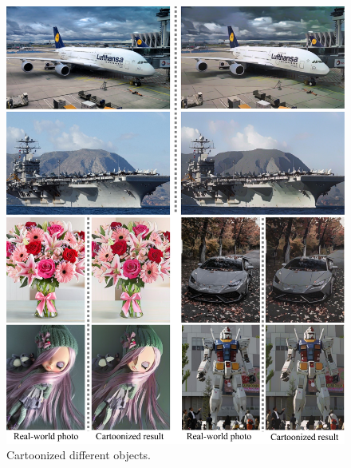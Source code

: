 \documentclass[10pt,twocolumn,letterpaper]{article}
\begin{document}
\begin{figure}[b]
\vspace{-0.5em}
\centering
\includegraphics[width=\linewidth]{figures/object.pdf}
\caption{Cartoonized different objects.}
\label{fig:object}
\end{figure}
\end{document}
